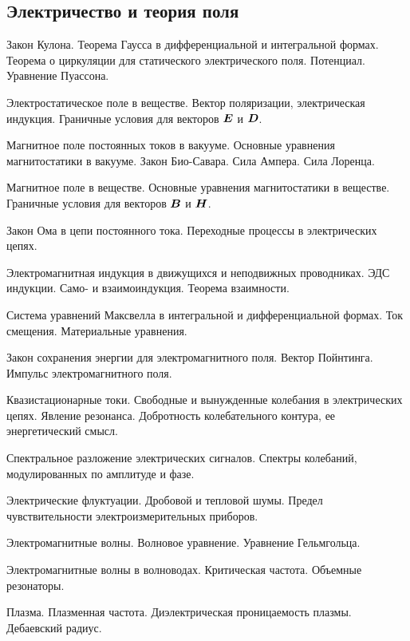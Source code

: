 \subsection*{Электричество и теория поля}
\begin{enumerate*}
\setcounter{enumi}{20}
\item Закон Кулона. Теорема Гаусса в дифференциальной и интегральной формах. Теорема о циркуляции для статического электрического поля. Потенциал. Уравнение Пуассона.
\item Электростатическое поле в веществе. Вектор поляризации, электрическая индукция. Граничные
условия для векторов $\mbox{\boldmath $E$}$ и $\mbox{\boldmath $D$}$.
\item Магнитное поле постоянных токов в вакууме. Основные уравнения магнитостатики в вакууме. Закон Био-Савара. Сила Ампера. Сила Лоренца.
\item Магнитное поле в веществе. Основные уравнения магнитостатики в веществе. Граничные условия
для векторов $\mbox{\boldmath $B$}$ и $\mbox{\boldmath $H$}$.
\item Закон Ома в цепи постоянного тока. Переходные процессы в электрических цепях.
\item Электромагнитная индукция в движущихся и неподвижных проводниках. ЭДС индукции. Само- и
взаимоиндукция. Теорема взаимности.
\item Система уравнений Максвелла в интегральной и дифференциальной формах. Ток смещения. Материальные уравнения.
\item Закон сохранения энергии для электромагнитного поля. Вектор Пойнтинга. Импульс электромагнитного поля.
\item Квазистационарные токи. Свободные и вынужденные колебания в электрических цепях. Явление
резонанса. Добротность колебательного контура, ее энергетический смысл.
\item Спектральное разложение электрических сигналов. Спектры колебаний, модулированных по амплитуде и фазе.
\item Электрические флуктуации. Дробовой и тепловой шумы. Предел чувствительности электроизмерительных приборов.
\item Электромагнитные волны. Волновое уравнение. Уравнение Гельмгольца.
\item Электромагнитные волны в волноводах. Критическая частота. Объемные резонаторы.
\item Плазма. Плазменная частота. Диэлектрическая проницаемость плазмы. Дебаевский радиус.
\end{enumerate*}


